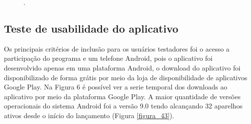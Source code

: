 \begin{figure}[H]
.
\label{figura_44}
\end{figure}


\subsection{Teste de usabilidade do aplicativo}

Os principais critérios de inclusão para os usuários testadores foi o acesso a participação do programa e um telefone Android, pois o aplicativo foi desenvolvido apenas em uma plataforma Android, o download do aplicativo foi disponibilizado de forma grátis por meio da loja de disponibilidade de aplicativos Google Play.
Na Figura 6 é possível ver a serie temporal dos downloads ao aplicativo por meio da plataforma Google Play. A maior quantidade de versões operacionais do sistema Android foi a versão 9.0 tendo alcançando 32 aparelhos ativos desde o início do lançamento (Figura \ref{figura_43}).

